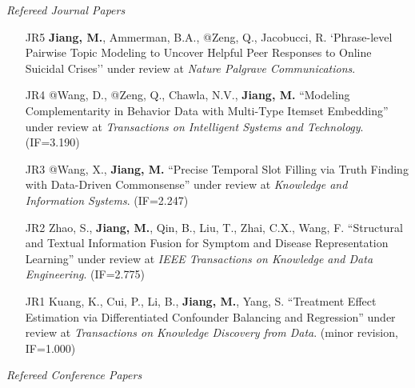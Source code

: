\documentclass[10pt]{article}
\newenvironment{myindentpar}[1]%
{\begin{list}{}%
         {\setlength{\leftmargin}{#1}}%
         \item[]%
}
{\end{list}}
\newcounter{list}
\begin{document}
\begin{myindentpar}{0.00cm}

\hspace{-0.25cm}\emph{Refereed Journal Papers}

\begin{enumerate}[leftmargin=.5cm]


\item[JR5] \textbf{Jiang, M.}, Ammerman, B.A., @Zeng, Q., Jacobucci, R. `Phrase-level Pairwise Topic Modeling to Uncover Helpful Peer Responses to Online Suicidal Crises'' under review at \textit{Nature Palgrave Communications}.
		
\item[JR4] @Wang, D., @Zeng, Q., Chawla, N.V., \textbf{Jiang, M.} ``Modeling Complementarity in Behavior Data with Multi-Type Itemset Embedding'' under review at \textit{Transactions on Intelligent Systems and Technology}. (IF=3.190)

\item[JR3] @Wang, X., \textbf{Jiang, M.} ``Precise Temporal Slot Filling via Truth Finding with Data-Driven Commonsense'' under review at \textit{Knowledge and Information Systems}. (IF=2.247)

\item[JR2] Zhao, S., \textbf{Jiang, M.}, Qin, B., Liu, T., Zhai, C.X., Wang, F. ``Structural and Textual Information Fusion for Symptom and Disease Representation Learning'' under review at \textit{IEEE Transactions on Knowledge and Data Engineering}. (IF=2.775)

\item[JR1] Kuang, K., Cui, P., Li, B., \textbf{Jiang, M.}, Yang, S. ``Treatment Effect Estimation via Differentiated Confounder Balancing and Regression'' under review at \textit{Transactions on Knowledge Discovery from Data}. (minor revision, IF=1.000)

\end{enumerate}

\vspace{.2cm}\hspace{-0.25cm}\emph{Refereed Conference Papers}

\begin{enumerate}[leftmargin=.5cm]


\end{enumerate}
\end{myindentpar}
\end{document}
